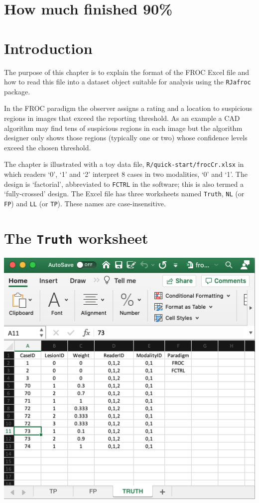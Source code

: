 \documentclass[
]{book}
\begin{document}
\hypertarget{quick-start-froc-how-much-finished}{%
\section{How much finished 90\%}\label{quick-start-froc-how-much-finished}}

\hypertarget{quick-start-froc-data-intro}{%
\section{Introduction}\label{quick-start-froc-data-intro}}

The purpose of this chapter is to explain the format of the FROC Excel file and how to read this file into a dataset object suitable for analysis using the \texttt{RJafroc} package.

In the FROC paradigm the observer assigns a rating and a location to suspicious regions in images that exceed the reporting threshold. As an example a CAD algorithm may find tens of suspicious regions in each image but the algorithm designer only shows those regions (typically one or two) whose confidence levels exceed the chosen threshold.

The chapter is illustrated with a toy data file, \texttt{R/quick-start/frocCr.xlsx} in which readers `0', `1' and `2' interpret 8 cases in two modalities, `0' and `1'. The design is `factorial', abbreviated to \texttt{FCTRL} in the software; this is also termed a `fully-crossed' design. The Excel file has three worksheets named \texttt{Truth}, \texttt{NL} (or \texttt{FP}) and \texttt{LL} (or \texttt{TP}). These names are case-insensitive.

\hypertarget{quick-start-froc-data-truth}{%
\section{\texorpdfstring{The \texttt{Truth} worksheet}{The Truth worksheet}}\label{quick-start-froc-data-truth}}

\includegraphics[width=1\textwidth,height=\textheight]{images/quick-start/frocCrTruth.png}
\end{document}
